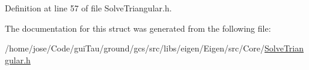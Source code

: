 Definition at line 57 of file Solve\-Triangular.\-h.



The documentation for this struct was generated from the following file\-:\begin{DoxyCompactItemize}
\item 
/home/jose/\-Code/gui\-Tau/ground/gcs/src/libs/eigen/\-Eigen/src/\-Core/\hyperlink{_solve_triangular_8h}{Solve\-Triangular.\-h}\end{DoxyCompactItemize}
